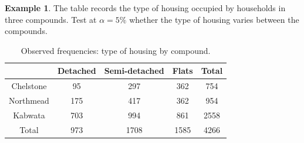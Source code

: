 \documentclass[11pt,a4paper]{article}
\theoremstyle{definition}
\newtheorem{example}[thm]{Example}
\begin{document}
\begin{example}
The table records the type of housing occupied by households in three compounds.
Test at $\alpha=5\%$ whether the type of housing varies between the compounds.
\begin{table}[H]
\centering
\begin{tabular}{c|ccc|c}
& Detached & Semi-detached & Flats & Total\\
\hline Chelstone & 95 & 297 & 362 & 754\\
Northmead & 175 & 417 & 362 & 954\\
Kabwata & 703 & 994 & 861 & 2558\\
\hline Total & 973 & 1708 &  1585 & 4266\\
\end{tabular}
\caption{Observed frequencies: type of housing by compound.}
\end{table}
\end{example}
\end{document}
